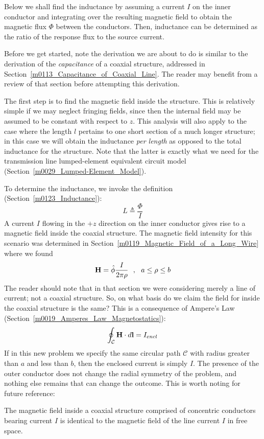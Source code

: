 Below we shall find the inductance by assuming a current $I$ on the inner conductor and integrating over the resulting magnetic field to obtain the magnetic flux $\Phi$ between the conductors.  Then, inductance can be determined as the ratio of the response flux to the source current.

Before we get started, note the derivation we are about to do is similar to the derivation of the \emph{capacitance} of a coaxial structure, addressed in Section~\ref{m0113_Capacitance_of_Coaxial_Line}.  The reader may benefit from a review of that section before attempting this derivation.

The first step is to find the magnetic field inside the structure.
This is relatively simple if we may neglect fringing fields, 
since then the internal field may be assumed to be constant with respect to $z$.
This analysis will also apply to the case where the length $l$ pertains to one short section of a much longer structure; in this case we will obtain the inductance \emph{per length} as opposed to the total inductance for the structure.
Note that the latter is exactly what we need for the transmission line lumped-element equivalent circuit model (Section~\ref{m0029_Lumped-Element_Model}).

To determine the inductance, we invoke the definition (Section~\ref{m0123_Inductance}):
%
\begin{equation}
L \triangleq \frac{\Phi}{I}
\label{m0125_eIndDef}
\end{equation}
%
A current $I$ flowing in the $+z$ direction on the inner conductor gives rise to a magnetic field inside the coaxial structure.
The magnetic field intensity for this scenario was determined in Section~\ref{m0119_Magnetic_Field_of_a_Long_Wire} where we found
%
\begin{equation}
{\bf H} = \hat{\phi} \frac{I}{2\pi \rho} ~~, ~~ a \le\rho\le b
\end{equation}
%
The reader should note that in that section we were considering merely a line of current; not a coaxial structure.
So, on what basis do we claim the field for inside the coaxial structure is the same?
This is a consequence of Ampere's Law 
(Section~\ref{m0019_Amperes_Law_Magnetostatics}):
%
\begin{equation}
\oint_{\mathcal C} {\bf H}\cdot d{\bf l} = I_{encl}
\end{equation}
%
If in this new problem we specify the same circular path $\mathcal{C}$ with radius greater than $a$ and less than $b$, then the enclosed current is simply $I$.
The presence of the outer conductor does not change the radial symmetry of the problem, and nothing else remains that can change the outcome.
This is worth noting for future reference:
%
\begin{mdframed}[backgroundcolor=yellow!20,nobreak=true] 
The magnetic field inside a coaxial structure comprised of concentric conductors bearing current $I$ is identical to the magnetic field of the line current $I$ in free space.
\end{mdframed}

